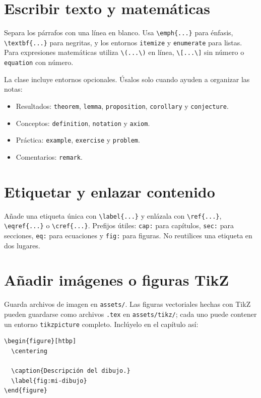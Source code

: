 \section{Escribir texto y matemáticas}

Separa los párrafos con una línea en blanco. Usa \verb|\emph{...}| para énfasis, \verb|\textbf{...}| para negritas, y los entornos \verb|itemize| y \verb|enumerate| para listas. Para expresiones matemáticas utiliza \verb|\(...\)| en línea, \verb|\[...\]| sin número o \verb|equation| con número.

La clase incluye entornos opcionales. Úsalos solo cuando ayuden a organizar las notas:

\begin{itemize}
  \item Resultados: \verb|theorem|, \verb|lemma|, \verb|proposition|, \verb|corollary| y \verb|conjecture|.
  \item Conceptos: \verb|definition|, \verb|notation| y \verb|axiom|.
  \item Práctica: \verb|example|, \verb|exercise| y \verb|problem|.
  \item Comentarios: \verb|remark|.
\end{itemize}

\section{Etiquetar y enlazar contenido}

Añade una etiqueta única con \verb|\label{...}| y enlázala con \verb|\ref{...}|, \verb|\eqref{...}| o \verb|\cref{...}|. Prefijos útiles: \verb|cap:| para capítulos, \verb|sec:| para secciones, \verb|eq:| para ecuaciones y \verb|fig:| para figuras. No reutilices una etiqueta en dos lugares.

\section{Añadir imágenes o figuras TikZ}

Guarda archivos de imagen en \texttt{assets/}. Las figuras vectoriales hechas con TikZ pueden guardarse como archivos \texttt{.tex} en \texttt{assets/tikz/}; cada uno puede contener un entorno \verb|tikzpicture| completo. Inclúyelo en el capítulo así:

\begin{verbatim}
\begin{figure}[htbp]
  \centering
  
  \caption{Descripción del dibujo.}
  \label{fig:mi-dibujo}
\end{figure}
\end{verbatim}

